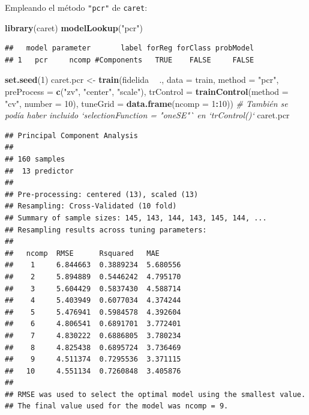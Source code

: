 \documentclass[
  spanish,
]{book}
\newenvironment{Shaded}{\begin{snugshade}}{\end{snugshade}}
\newcommand{\CommentTok}[1]{\textcolor[rgb]{0.56,0.35,0.01}{\textit{#1}}}
\newcommand{\DataTypeTok}[1]{\textcolor[rgb]{0.13,0.29,0.53}{#1}}
\newcommand{\DecValTok}[1]{\textcolor[rgb]{0.00,0.00,0.81}{#1}}
\newcommand{\KeywordTok}[1]{\textcolor[rgb]{0.13,0.29,0.53}{\textbf{#1}}}
\newcommand{\NormalTok}[1]{#1}
\newcommand{\OperatorTok}[1]{\textcolor[rgb]{0.81,0.36,0.00}{\textbf{#1}}}
\newcommand{\StringTok}[1]{\textcolor[rgb]{0.31,0.60,0.02}{#1}}
\theoremstyle{break}
\theoremstyle{definition}
\theoremstyle{definition}
\theoremstyle{definition}
\theoremstyle{remark}
\begin{document}
Empleando el método \texttt{"pcr"} de \texttt{caret}:

\begin{Shaded}
\begin{Highlighting}[]
\KeywordTok{library}\NormalTok{(caret)}
\KeywordTok{modelLookup}\NormalTok{(}\StringTok{"pcr"}\NormalTok{)}
\end{Highlighting}
\end{Shaded}

\begin{verbatim}
##   model parameter       label forReg forClass probModel
## 1   pcr     ncomp #Components   TRUE    FALSE     FALSE
\end{verbatim}

\begin{Shaded}
\begin{Highlighting}[]
\KeywordTok{set.seed}\NormalTok{(}\DecValTok{1}\NormalTok{)}
\NormalTok{caret.pcr <-}\StringTok{ }\KeywordTok{train}\NormalTok{(fidelida }\OperatorTok{~}\StringTok{ }\NormalTok{., }\DataTypeTok{data =}\NormalTok{ train, }\DataTypeTok{method =} \StringTok{"pcr"}\NormalTok{,}
                   \DataTypeTok{preProcess =} \KeywordTok{c}\NormalTok{(}\StringTok{"zv"}\NormalTok{, }\StringTok{"center"}\NormalTok{, }\StringTok{"scale"}\NormalTok{),}
                   \DataTypeTok{trControl =} \KeywordTok{trainControl}\NormalTok{(}\DataTypeTok{method =} \StringTok{"cv"}\NormalTok{, }\DataTypeTok{number =} \DecValTok{10}\NormalTok{),}
                   \DataTypeTok{tuneGrid =} \KeywordTok{data.frame}\NormalTok{(}\DataTypeTok{ncomp =} \DecValTok{1}\OperatorTok{:}\DecValTok{10}\NormalTok{))}
\CommentTok{# También se podía haber incluido `selectionFunction = "oneSE"` en `trControl()`}
\NormalTok{caret.pcr}
\end{Highlighting}
\end{Shaded}

\begin{verbatim}
## Principal Component Analysis 
## 
## 160 samples
##  13 predictor
## 
## Pre-processing: centered (13), scaled (13) 
## Resampling: Cross-Validated (10 fold) 
## Summary of sample sizes: 145, 143, 144, 143, 145, 144, ... 
## Resampling results across tuning parameters:
## 
##   ncomp  RMSE      Rsquared   MAE     
##    1     6.844663  0.3889234  5.680556
##    2     5.894889  0.5446242  4.795170
##    3     5.604429  0.5837430  4.588714
##    4     5.403949  0.6077034  4.374244
##    5     5.476941  0.5984578  4.392604
##    6     4.806541  0.6891701  3.772401
##    7     4.830222  0.6886805  3.780234
##    8     4.825438  0.6895724  3.736469
##    9     4.511374  0.7295536  3.371115
##   10     4.551134  0.7260848  3.405876
## 
## RMSE was used to select the optimal model using the smallest value.
## The final value used for the model was ncomp = 9.
\end{verbatim}
\end{document}

